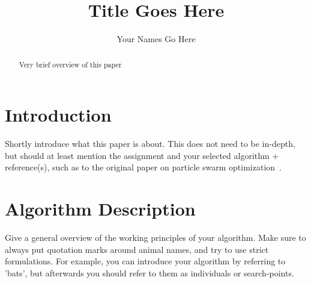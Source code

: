\documentclass[runningheads]{llncs}
\begin{document}
%
\title{Title Goes Here}
%
%
\author{Your Names Go Here}
%
%
%
\maketitle              %
%
\begin{abstract}
Very brief overview of this paper
\end{abstract}





\section{Introduction}
Shortly introduce what this paper is about. This does not need to be in-depth, but should at least mention the assignment and your selected algorithm + reference(s), such as to the original paper on particle swarm optimization~\cite{eberhart1995particle}.

\section{Algorithm Description} \label{sec:description}
Give a general overview of the working principles of your algorithm. Make sure to always put quotation marks around animal names, and try to use strict formulations. For example, you can introduce your algorithm by referring to 'bats', but afterwards you should refer to them as individuals or search-points. 
\end{document}
